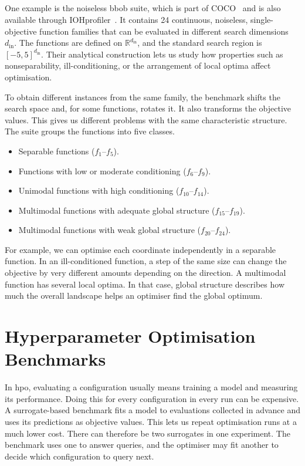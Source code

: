 \subsection{}
\label{sec:ch03:bbob}

One example is the noiseless \Gls{bbob} suite, which is part of COCO~\citep{HanEtAl21} and is also available through IOHprofiler~\citep{DoeEtAl18,WanEtAl22,DeNEtAl24}. It contains 24 continuous, noiseless, single-objective function families that can be evaluated in different search dimensions $d_{\mathrm{in}}$. The functions are defined on $\mathbb R^{d_{\mathrm{in}}}$, and the standard search region is $[-5,5]^{d_{\mathrm{in}}}$. Their analytical construction lets us study how properties such as nonseparability, ill-conditioning, or the arrangement of local optima affect optimisation.

To obtain different instances from the same family, the benchmark shifts the search space and, for some functions, rotates it. It also transforms the objective values. This gives us different problems with the same characteristic structure. The suite groups the functions into five classes.
\begin{itemize}
    \item Separable functions ($f_1$--$f_5$).
    \item Functions with low or moderate conditioning ($f_6$--$f_9$).
    \item Unimodal functions with high conditioning ($f_{10}$--$f_{14}$).
    \item Multimodal functions with adequate global structure ($f_{15}$--$f_{19}$).
    \item Multimodal functions with weak global structure ($f_{20}$--$f_{24}$).
\end{itemize}
For example, we can optimise each coordinate independently in a separable function. In an ill-conditioned function, a step of the same size can change the objective by very different amounts depending on the direction. A multimodal function has several local optima. In that case, global structure describes how much the overall landscape helps an optimiser find the global optimum.

\section{Hyperparameter Optimisation Benchmarks}
\label{sec:ch03:hpo_benchmarks_overview}

In \gls{hpo}, evaluating a configuration usually means training a model and measuring its performance. Doing this for every configuration in every run can be expensive. A surrogate-based benchmark fits a model to evaluations collected in advance and uses its predictions as objective values. This lets us repeat optimisation runs at a much lower cost. There can therefore be two surrogates in one experiment. The benchmark uses one to answer queries, and the optimiser may fit another to decide which configuration to query next.

